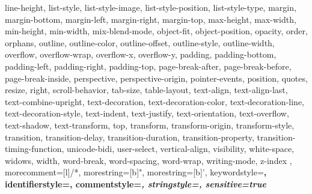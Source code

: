 {{        line-height, list-style, list-style-image, list-style-position, 
        list-style-type, margin, margin-bottom, margin-left, margin-right, 
        margin-top, max-height, max-width, min-height, min-width, 
        mix-blend-mode, object-fit, object-position, opacity, order, orphans, 
        outline, outline-color, outline-offset, outline-style, outline-width, 
        overflow, overflow-wrap, overflow-x, overflow-y, padding, 
        padding-bottom, padding-left, padding-right, padding-top, 
        page-break-after, page-break-before, page-break-inside, perspective, 
        perspective-origin, pointer-events, position, quotes, resize, 
        right, scroll-behavior, tab-size, table-layout, text-align, 
        text-align-last, text-combine-upright, text-decoration, 
        text-decoration-color, text-decoration-line, text-decoration-style, 
        text-indent, text-justify, text-orientation, text-overflow, 
        text-shadow, text-transform, top, transform, transform-origin, 
        transform-style, transition, transition-delay, 
        transition-duration, transition-property, transition-timing-function, 
        unicode-bidi, user-select, vertical-align, visibility, 
        white-space, widows, width, word-break, word-spacing, word-wrap, 
        writing-mode, z-index
    },
    morecomment=[l]{/*}, %
    morestring=[b]", %
    morestring=[b]',
    keywordstyle=\color{blue}\bfseries, %
    identifierstyle=\color{black}, %
    commentstyle=\color{green}\itshape, %
    stringstyle=\color{red}, %
    sensitive=true %
}

  